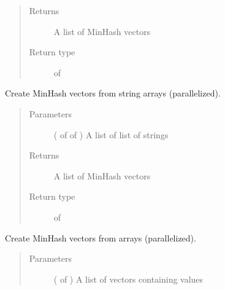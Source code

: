 \documentclass[letterpaper,10pt,english]{sphinxmanual}
\begin{document}
\begin{fulllineitems}
\begin{fulllineitems}
\begin{quote}
\begin{description}
\item[{Returns}] \leavevmode
A list of MinHash vectors

\item[{Return type}] \leavevmode
{} of 

\end{description}\end{quote}

\end{fulllineitems}


\begin{fulllineitems}
\label{\detokenize{documentation:tmap.Minhash.batch_from_string_array}}
Create MinHash vectors from string arrays (parallelized).
\begin{quote}\begin{description}
\item[{Parameters}] \leavevmode
{} ( of  of ) \textendash{} A list of list of strings

\item[{Returns}] \leavevmode
A list of MinHash vectors

\item[{Return type}] \leavevmode
{} of 

\end{description}\end{quote}

\end{fulllineitems}


\begin{fulllineitems}
\label{\detokenize{documentation:tmap.Minhash.batch_from_weight_array}}
Create MinHash vectors from  arrays (parallelized).
\begin{quote}\begin{description}
\item[{Parameters}] \leavevmode
{} ( of ) \textendash{} A list of vectors containing  values


\end{description}
\end{quote}
\end{fulllineitems}
\end{fulllineitems}
\end{document}
